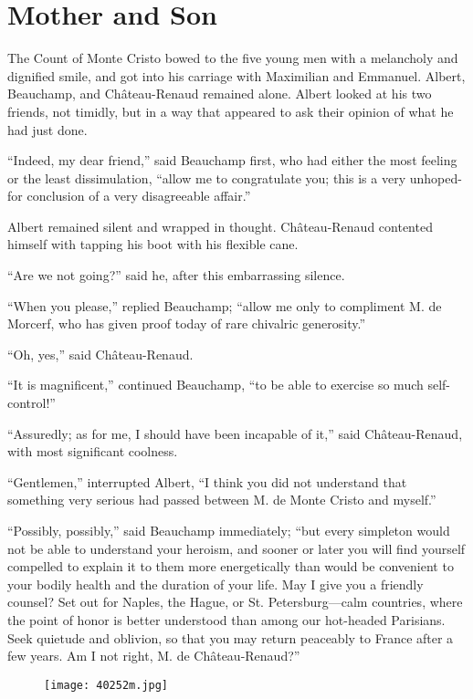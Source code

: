 \chapter{Mother and Son}

The Count of Monte Cristo bowed to the five young men with a melancholy
and dignified smile, and got into his carriage with Maximilian and
Emmanuel. Albert, Beauchamp, and Château-Renaud remained alone. Albert
looked at his two friends, not timidly, but in a way that appeared to
ask their opinion of what he had just done.

“Indeed, my dear friend,” said Beauchamp first, who had either the most
feeling or the least dissimulation, “allow me to congratulate you; this
is a very unhoped-for conclusion of a very disagreeable affair.”

Albert remained silent and wrapped in thought. Château-Renaud contented
himself with tapping his boot with his flexible cane.

“Are we not going?” said he, after this embarrassing silence.

“When you please,” replied Beauchamp; “allow me only to compliment M.
de Morcerf, who has given proof today of rare chivalric generosity.”

“Oh, yes,” said Château-Renaud.

“It is magnificent,” continued Beauchamp, “to be able to exercise so
much self-control!”

“Assuredly; as for me, I should have been incapable of it,” said
Château-Renaud, with most significant coolness.

“Gentlemen,” interrupted Albert, “I think you did not understand that
something very serious had passed between M. de Monte Cristo and
myself.”

“Possibly, possibly,” said Beauchamp immediately; “but every simpleton
would not be able to understand your heroism, and sooner or later you
will find yourself compelled to explain it to them more energetically
than would be convenient to your bodily health and the duration of your
life. May I give you a friendly counsel? Set out for Naples, the Hague,
or St. Petersburg—calm countries, where the point of honor is better
understood than among our hot-headed Parisians. Seek quietude and
oblivion, so that you may return peaceably to France after a few years.
Am I not right, M. de Château-Renaud?”

\begin{figure}[ht]
\texttt{[image: 40252m.jpg]}
\end{figure}

